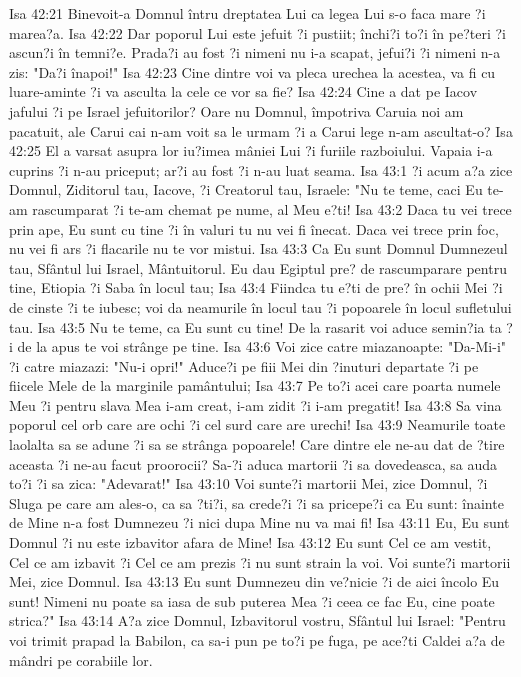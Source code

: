 Isa 42:21  Binevoit-a Domnul întru dreptatea Lui ca legea Lui s-o faca mare ?i marea?a.
Isa 42:22  Dar poporul Lui este jefuit ?i pustiit; închi?i to?i în pe?teri ?i ascun?i în temni?e. Prada?i au fost ?i nimeni nu i-a scapat, jefui?i ?i nimeni n-a zis: "Da?i înapoi!"
Isa 42:23  Cine dintre voi va pleca urechea la acestea, va fi cu luare-aminte ?i va asculta la cele ce vor sa fie?
Isa 42:24  Cine a dat pe Iacov jafului ?i pe Israel jefuitorilor? Oare nu Domnul, împotriva Caruia noi am pacatuit, ale Carui cai n-am voit sa le urmam ?i a Carui lege n-am ascultat-o?
Isa 42:25  El a varsat asupra lor iu?imea mâniei Lui ?i furiile razboiului. Vapaia i-a cuprins ?i n-au priceput; ar?i au fost ?i n-au luat seama.
Isa 43:1  ?i acum a?a zice Domnul, Ziditorul tau, Iacove, ?i Creatorul tau, Israele: "Nu te teme, caci Eu te-am rascumparat ?i te-am chemat pe nume, al Meu e?ti!
Isa 43:2  Daca tu vei trece prin ape, Eu sunt cu tine ?i în valuri tu nu vei fi înecat. Daca vei trece prin foc, nu vei fi ars ?i flacarile nu te vor mistui.
Isa 43:3  Ca Eu sunt Domnul Dumnezeul tau, Sfântul lui Israel, Mântuitorul. Eu dau Egiptul pre? de rascumparare pentru tine, Etiopia ?i Saba în locul tau;
Isa 43:4  Fiindca tu e?ti de pre? în ochii Mei ?i de cinste ?i te iubesc; voi da neamurile în locul tau ?i popoarele în locul sufletului tau.
Isa 43:5  Nu te teme, ca Eu sunt cu tine! De la rasarit voi aduce semin?ia ta ?i de la apus te voi strânge pe tine.
Isa 43:6  Voi zice catre miazanoapte: "Da-Mi-i" ?i catre miazazi: "Nu-i opri!" Aduce?i pe fiii Mei din ?inuturi departate ?i pe fiicele Mele de la marginile pamântului;
Isa 43:7  Pe to?i acei care poarta numele Meu ?i pentru slava Mea i-am creat, i-am zidit ?i i-am pregatit!
Isa 43:8  Sa vina poporul cel orb care are ochi ?i cel surd care are urechi!
Isa 43:9  Neamurile toate laolalta sa se adune ?i sa se strânga popoarele! Care dintre ele ne-au dat de ?tire aceasta ?i ne-au facut proorocii? Sa-?i aduca martorii ?i sa dovedeasca, sa auda to?i ?i sa zica: "Adevarat!"
Isa 43:10  Voi sunte?i martorii Mei, zice Domnul, ?i Sluga pe care am ales-o, ca sa ?ti?i, sa crede?i ?i sa pricepe?i ca Eu sunt: înainte de Mine n-a fost Dumnezeu ?i nici dupa Mine nu va mai fi!
Isa 43:11  Eu, Eu sunt Domnul ?i nu este izbavitor afara de Mine!
Isa 43:12  Eu sunt Cel ce am vestit, Cel ce am izbavit ?i Cel ce am prezis ?i nu sunt strain la voi. Voi sunte?i martorii Mei, zice Domnul.
Isa 43:13  Eu sunt Dumnezeu din ve?nicie ?i de aici încolo Eu sunt! Nimeni nu poate sa iasa de sub puterea Mea ?i ceea ce fac Eu, cine poate strica?"
Isa 43:14  A?a zice Domnul, Izbavitorul vostru, Sfântul lui Israel: "Pentru voi trimit prapad la Babilon, ca sa-i pun pe to?i pe fuga, pe ace?ti Caldei a?a de mândri pe corabiile lor.
